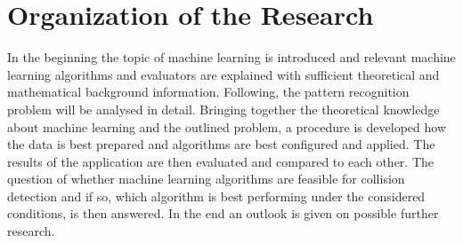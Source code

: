 \section{Organization of the Research}
In the beginning the topic of machine learning is introduced and relevant machine learning algorithms and evaluators are explained with sufficient theoretical and mathematical background information. Following, the pattern recognition problem will be analysed in detail. Bringing together the theoretical knowledge about machine learning and the outlined problem, a procedure is developed how the data is best prepared and algorithms are best configured and applied. The results of the application are then evaluated and compared to each other. The question of whether machine learning algorithms are feasible for collision detection and if so, which algorithm is best performing under the considered conditions, is then answered. In the end an outlook is given on possible further research.
